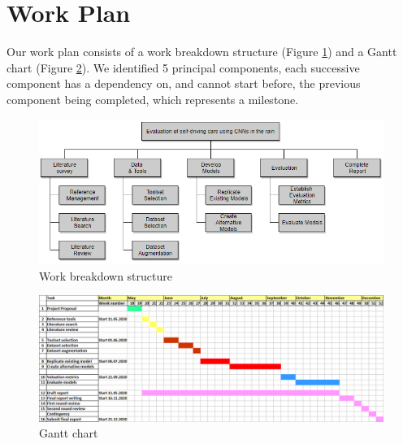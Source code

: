 \section{Work Plan}

Our work plan consists of a work breakdown structure (Figure \ref{fig:workplan}) and a Gantt chart (Figure \ref{fig:gantt-chart}).
We identified 5 principal components, each successive component has a dependency on, and cannot start before, the previous component being completed, which represents a milestone.

\begin{figure}[h]
\centering\includegraphics[width=1\linewidth]{figures/work-breakdown-structure.png}
\caption{Work breakdown structure}
\label{fig:workplan}
\end{figure}

\begin{figure}[h]
\begin{center}
\includegraphics[scale=0.55] {figures/gantt-chart-v3.png}
\caption{Gantt chart}
\label{fig:gantt-chart}
\end{center}
\end{figure}




